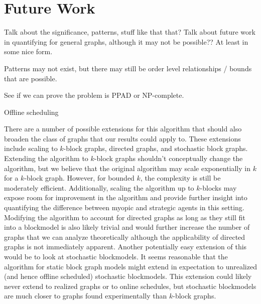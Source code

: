 \documentclass{article}
\begin{document}
\section{Future Work}

Talk about the significance, patterns, stuff like that that? Talk
about future work in quantifying for general graphs, although it may
not be possible?? At least in some nice form.

Patterns may not exist, but there may still be order level
relationships / bounds that are possible.

See if we can prove the problem is PPAD or NP-complete.

Offline scheduling

There are a number of possible extensions for this algorithm that
should also broaden the class of graphs that our results could apply
to. These extensions include scaling to $k$-block graphs, directed
graphs, and stochastic block graphs. Extending the algorithm to
$k$-block graphs shouldn’t conceptually change the algorithm, but we
believe that the original algorithm may scale exponentially in $k$ for
a $k$-block graph. However, for bounded $k$, the complexity is still
be moderately efficient. Additionally, scaling the algorithm up to
$k$-blocks may expose room for improvement in the algorithm and
provide further insight into quantifying the difference between myopic
and strategic agents in this setting. Modifying the algorithm to
account for directed graphs as long as they still fit into a
blockmodel is also likely trivial and would further increase the
number of graphs that we can analyze theoretically although the
applicability of directed graphs is not immediately apparent. Another
potentially easy extension of this would be to look at stochastic
blockmodels\cite{Wang87, Snijders97}. It seems reasonable that the
algorithm for static block graph models might extend in expectation to
unrealized (and hence offline scheduled) stochastic blockmodels. This
extension could likely never extend to realized graphs or to online
schedules, but stochastic blockmodels are much closer to graphs found
experimentally than $k$-block graphs.




\end{document}
